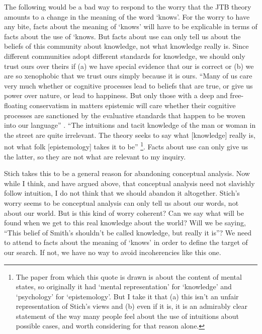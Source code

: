 The following would be a bad way to respond to the worry that the JTB theory amounts to a change in the meaning of the word `knows'. For the worry to have any bite, facts about the meaning of `knows' will have to be explicable in terms of facts about the use of `knows. But facts about use can only tell us about the beliefs of this community about knowledge, not what knowledge really is. Since different communities adopt different standards for knowledge, we should only trust ours over theirs if (a) we have special evidence that our is correct or (b) we are so xenophobic that we trust ours simply because it is ours. ``Many of us care very much whether or cognitive processes lead to beliefs that are true, or give us power over nature, or lead to happiness. But only those with a deep and free-floating conservatism in matters epistemic will care whether their cognitive processes are sanctioned by the evaluative standards that happen to be woven into our language'' \cite[109]{Stich1988}.  ``The intuitions and tacit knowledge of the man or woman in the street are quite irrelevant. The theory seeks to say what [knowledge] really is, not what folk [epistemology] takes it to be'' \cite[252]{Stich1992}\footnote{The paper from which this quote is drawn is about the content of mental states, so originally it had `mental representation' for `knowledge' and `psychology' for `epistemology'. But I take it that (a) this isn't an unfair representation of Stich's views and (b) even if it is, it is an admirably clear statement of the way many people feel about the use of intuitions about possible cases, and worth considering for that reason alone.}. Facts about use can only give us the latter, so they are not what are relevant to my inquiry.

Stich takes this to be a general reason for abandoning conceptual analysis. Now while I think, and have argued above, that conceptual analysis need not slavishly follow intuition, I do not think that we should abandon it altogether. Stich's worry seems to be conceptual analysis can only tell us about our words, not about our world. But is this kind of worry coherent? Can we say what will be found when we get to this real knowledge about the world? Will we be saying, ``This belief of Smith's shouldn't be called knowledge, but really it is''? We need to attend to facts about the meaning of `knows' in order to define the target of our search. If not, we have no way to avoid incoherencies like this one.

